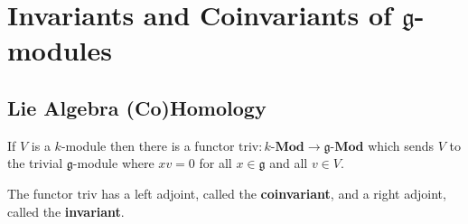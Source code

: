 \section{Invariants and Coinvariants of $\mathfrak{g}$-modules} %
\label{chap:Invariants and Coinvariants of}
\subsection{Lie Algebra (Co)Homology} %
\label{sec:Lie Algebra (Co)Homology}
If $ V $ is a $ k $-module then there is a functor $ \text{triv}:k\text{-}\mathbf{Mod} \to \mathfrak{g}\text{-}\mathbf{Mod} $ which sends $ V $ to the trivial $ \mathfrak{g} $-module where $ xv = 0 $ for all $ x \in \mathfrak{g} $ and all $ v \in V $.
\begin{proposition}
  The functor $ \text{triv} $ has a left adjoint, called the \textbf{coinvariant}, and a right adjoint, called the \textbf{invariant}.
\end{proposition}
